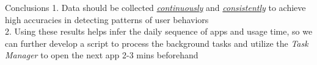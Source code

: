 \documentclass[final]{beamer}
\newlength{\colwidth}
\begin{document}
\begin{frame}[t]
\begin{columns}[t]
\begin{column}{\colwidth}
\begin{block}
              

      \end{block}

      \begin{block} {\huge{Conclusions}}     
        {
          \fontsize{37pt}{44.4pt} \selectfont
                1. Data should be collected \underline{\textit{continuously}} and \underline{\textit{consistently}} to achieve high accuracies in detecting patterns of user behaviors
                \\2. Using these results helps infer the daily sequence of apps and usage time, so we can further develop a script to process the background tasks and utilize the \textit{Task Manager} to open the next app 2-3 mins beforehand \\
        }
      \end{block}


\end{column}
\end{columns}
\end{frame}
\end{document}
